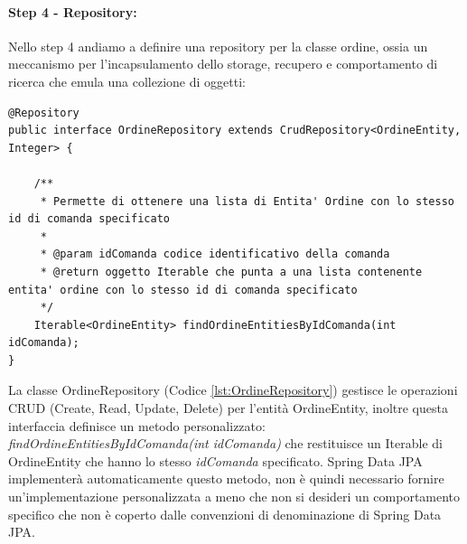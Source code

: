 \paragraph{Step 4 - Repository:}
Nello step 4 andiamo a definire una repository per la classe ordine, ossia un meccanismo per l’incapsulamento dello storage, recupero e comportamento di ricerca che emula una collezione di oggetti:
\begin{lstlisting}[style=myJava, 
    caption={Classe repository OrdineRepository.java}, label=lst:OrdineRepository, 
    emph={[3] findOrdineEntitiesByIdComanda },
    emphstyle={[3]\color{codeCyan}}]
@Repository
public interface OrdineRepository extends CrudRepository<OrdineEntity, Integer> {

    /**
     * Permette di ottenere una lista di Entita' Ordine con lo stesso id di comanda specificato
     *
     * @param idComanda codice identificativo della comanda
     * @return oggetto Iterable che punta a una lista contenente entita' ordine con lo stesso id di comanda specificato
     */
    Iterable<OrdineEntity> findOrdineEntitiesByIdComanda(int idComanda);
}
\end{lstlisting}
La classe OrdineRepository (Codice \vref{lst:OrdineRepository}) gestisce le operazioni CRUD (Create, Read, Update, Delete) per l’entità OrdineEntity, inoltre questa interfaccia definisce un metodo personalizzato:
\textit{findOrdineEntitiesByIdComanda(int idComanda)} che restituisce un Iterable di OrdineEntity che hanno lo stesso \textit{idComanda} specificato.
Spring Data JPA implementerà automaticamente questo metodo, non è quindi necessario fornire un’implementazione personalizzata a meno che non si desideri un comportamento specifico che non è coperto dalle convenzioni di denominazione di Spring Data JPA.
